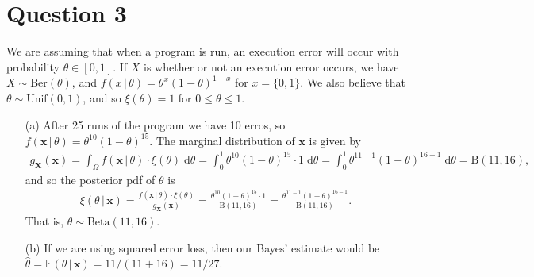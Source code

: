\documentclass[10pt]{article}
\begin{document}
\section{Question 3} \noindent
We are assuming that when a program is run, an execution error will occur with probability \(\theta \in [0,1]\). If \(X\) is whether or not an execution error
occurs, we have \(X \sim \mathrm{Ber}(\theta)\), and \(f(x \,|\, \theta) = \theta^x (1 - \theta)^{1 - x}\) for \(x = \{0,1\}\). We also believe that 
\(\theta \sim \mathrm{Unif}(0,1)\), and so \(\xi(\theta) = 1\) for \(0 \le \theta \le 1\).
\begin{itemize}
    \item[(a)] After 25 runs of the program we have 10 erros, so \(f(\mathbf{x} \,|\, \theta) = \theta^{10}(1 - \theta)^{15}\). The marginal distribution of 
    \(\mathbf{x}\) is given by 
    \begin{align*}
        g_{\bm{X}}(\mathbf{x})
        = \int_{\Omega} f(\mathbf{x} \,|\, \theta) \cdot \xi(\theta) \;\mathrm{d}\theta 
        = \int_0^1 \theta^{10} (1 - \theta)^{15} \cdot 1 \;\mathrm{d}\theta
        = \int_0^1 \theta^{11 - 1} (1 - \theta)^{16 - 1} \;\mathrm{d}\theta
        = \mathrm{B}(11, 16),
    \end{align*}
    and so the posterior pdf of \(\theta\) is 
    \begin{align*}
        \xi(\theta \,|\, \mathbf{x})
        = \frac{f(\mathbf{x} \,|\, \theta) \cdot \xi(\theta)}{g_{\bm{X}}(\mathbf{x})}
        = \frac{\theta^{10} (1 - \theta)^{15} \cdot 1}{\mathrm{B}(11, 16)}
        = \frac{\theta^{11 - 1} (1 - \theta)^{16 - 1}}{\mathrm{B}(11, 16)}.
    \end{align*}
    That is, \(\theta \sim \mathrm{Beta}(11, 16)\). 
    \item[(b)] If we are using squared error loss, then our Bayes' estimate would be 
    \(\hat{\theta} = \mathbb{E}(\theta \,|\, \mathbf{x}) = 11/(11 + 16) = 11/27\).
\end{itemize}

\end{document}
